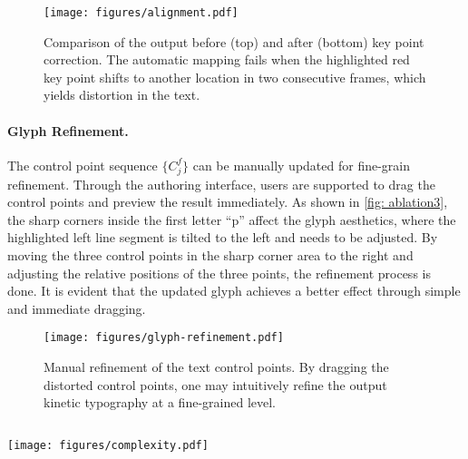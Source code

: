 \begin{figure}[h]
  \centering
  \texttt{[image: figures/alignment.pdf]}
  \caption{Comparison of the output before (top) and after (bottom) key point correction. The automatic mapping fails when the highlighted red key point shifts to another location in two consecutive frames, which yields distortion in the text.}
  \label{fig: ablation2}
\end{figure}


\paragraph{Glyph Refinement.}
The control point sequence $\{C_j^f\}$ can be manually updated for fine-grain refinement.
Through the authoring interface, users are supported to drag the control points and preview the result immediately.
As shown in \autoref{fig: ablation3}, the sharp corners inside the first letter ``p'' affect the glyph aesthetics, where the highlighted left line segment is tilted to the left and needs to be adjusted. 
By moving the three control points in the sharp corner area to the right and adjusting the relative positions of the three points, the refinement process is done. 
It is evident that the updated glyph achieves a better effect through simple and immediate dragging.


\begin{figure}[h]
  \centering
  \texttt{[image: figures/glyph-refinement.pdf]}
  \caption{Manual refinement of the text control points. By dragging the distorted control points, one may intuitively refine the output kinetic typography at a fine-grained level.}
  \label{fig: ablation3}
\end{figure}




\subsection{}
\label{sec:generalizability}
\begin{figure*}[h]
  \centering
  \texttt{[image: figures/complexity.pdf]}
  \caption{}
  \label{fig: complexity}
\end{figure*}

